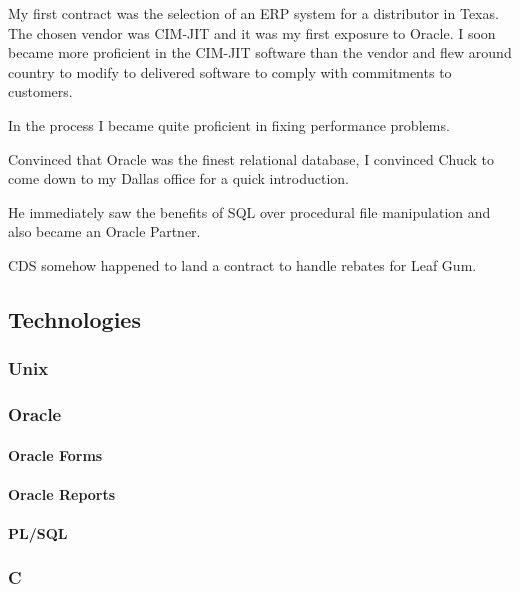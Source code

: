 \documentclass[letterpaper,10pt,english]{sphinxmanual}
\begin{document}
My first contract was the selection of an ERP system for a distributor in Texas.  The chosen vendor was CIM-JIT and it was my first exposure to Oracle. I soon
became more proficient in the CIM-JIT software than the vendor and flew around
country to modify to delivered software to comply with commitments to customers.

In the process I became quite proficient in fixing performance problems.

Convinced that Oracle was the finest relational database, I convinced Chuck to
come down to my Dallas office for a quick introduction.

He immediately saw the benefits of SQL over procedural file manipulation and
also became an Oracle Partner.

CDS somehow happened to land a contract to handle rebates for Leaf Gum.


\subsection{Technologies}
\label{\detokenize{Contributions:id6}}

\subsubsection{Unix}
\label{\detokenize{Contributions:id7}}

\subsubsection{Oracle}
\label{\detokenize{Contributions:id8}}

\paragraph{Oracle Forms}
\label{\detokenize{Contributions:id9}}

\paragraph{Oracle Reports}
\label{\detokenize{Contributions:id10}}

\paragraph{PL/SQL}
\label{\detokenize{Contributions:id11}}

\subsubsection{C}
\label{\detokenize{Contributions:id12}}
\end{document}
